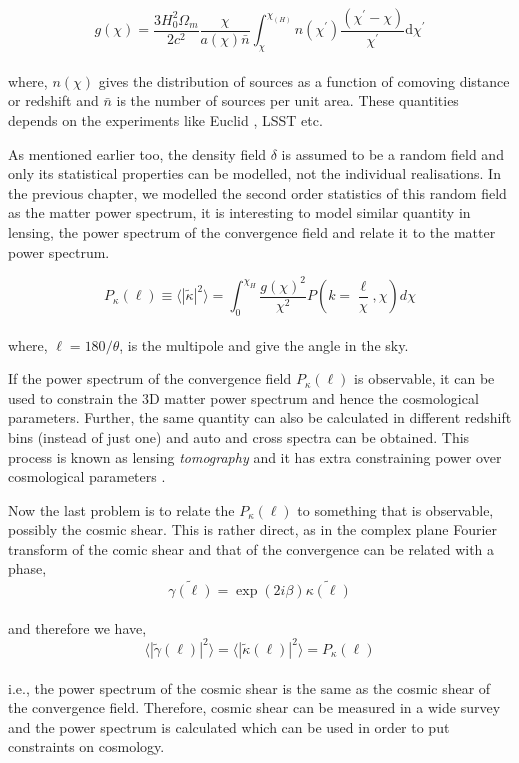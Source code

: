 \begin{equation}
	g(\chi) = \dfrac{3H_0^2\Omega_m}{2c^2} \dfrac{\chi}{a(\chi)\bar{n}} \int_{\chi}^{\chi_(H)}
					n(\chi^{\prime})
					\dfrac{(\chi^{\prime}-\chi)}{\chi^{\prime}}\mathrm{d}\chi^{\prime}
\end{equation}
\\
where, $n(\chi)$ gives the distribution of sources as a function of comoving distance or redshift
and $\bar{n}$ is the number of sources per unit area. These quantities depends on the
experiments like Euclid \cite{2013LRR....16....6A}, LSST \cite{2009arXiv0912.0201L} etc.

As mentioned earlier too, the density field $\delta$ is assumed to be a random field
and only its statistical properties can be modelled, not the individual realisations. 
In the previous chapter, we modelled the second order statistics of this random field
as the matter power spectrum, it is interesting to model similar quantity in lensing,
the power spectrum of the convergence field and relate it to the matter power spectrum.


\begin{equation}
	P_{\kappa}(\ell) \equiv \langle |\tilde{\kappa}|^2 \rangle = 
			\int_0^{\chi_H} \dfrac{g(\chi)^2}{\chi^2} 
			P\left(k=\dfrac{\ell}{\chi},\chi \right) d\chi
\end{equation}
\\
where, $\ell = 180/\theta$, is the multipole and give the angle in the sky. 

If the power spectrum of the convergence field $P_{\kappa}(\ell)$ is observable, it can be
used to constrain the 3D matter power spectrum and hence the cosmological parameters. Further,
the same quantity can also be calculated in different redshift bins (instead of just one) and
auto and cross spectra can be obtained. This process is known as 
lensing {\it tomography} and it has extra constraining power over cosmological parameters
\cite{1999ApJ...522L..21H,2004MNRAS.348..897T}.

Now the last problem is to relate the $P_{\kappa}(\ell)$ to something that is observable, 
possibly the cosmic shear. This is rather direct, as in the complex plane Fourier transform
of the comic shear and that of the
convergence can be related with a phase,
\begin{equation}
	\tilde{\gamma(\ell)} = \exp(2i\beta) \tilde{\kappa(\ell)}
\end{equation}
\\
and therefore we have,
\begin{equation}
	\langle |\tilde{\gamma}(\ell)|^2 \rangle = 
	\langle |\tilde{\kappa}(\ell)|^2 \rangle = P_{\kappa}(\ell)
\end{equation}
\\
i.e., the power spectrum of the cosmic shear is the same as the cosmic shear of the
convergence field. Therefore, cosmic shear can be measured in a wide survey and the 
power spectrum is calculated which can be used in order to put constraints on
cosmology.


